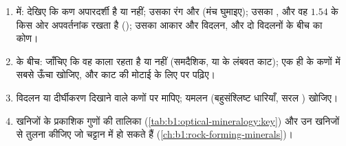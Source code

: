 \begin{method}\label{met:b1:optical-mineralogy:identify}
\begin{enumerate}
  \item {} में: देखिए कि कण अपारदर्शी है या नहीं; उसका रंग और  (मंच घुमाइए); उसका , और
        वह $1.54$ के किस ओर अपवर्तनांक रखता है (); उसका आकार और विदलन, और दो विदलनों के बीच का कोण।
  \item {} के बीच: जाँचिए कि वह काला रहता है या नहीं (समदैशिक, या  के लंबवत काट); एक ही 
        के कणों में सबसे ऊँचा  खोजिए, और काट की मोटाई के लिए  पर  पढ़िए।
  \item विदलन या दीर्घीकरण दिखाने वाले कणों पर  मापिए; यमलन (बहुसंश्लिष्ट धारियाँ, सरल ) खोजिए।
  \item खनिजों के प्रकाशिक गुणों की तालिका (\cref{tab:b1:optical-mineralogy:key}) और उन खनिजों से तुलना कीजिए जो चट्टान
        में हो सकते हैं (\cref{ch:b1:rock-forming-minerals})।
\end{enumerate}
\end{method}

